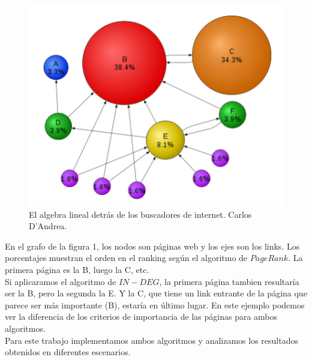 \begin{figure}
  \vspace{-20pt}
  \begin{center}
    \includegraphics[scale= 0.6]{imagenes/ejemplo-grafo-1.png}
  \end{center}
  \vspace{-20pt}
   \caption[Caption for LOF]{El algebra lineal detrás de los buscadores de internet. Carlos D'Andrea.\footnotemark}
  \vspace{-10pt}
  \label{fig:img1}
\end{figure}




En el grafo de la figura 1, los nodos son páginas web y los ejes son los links. Los porcentajes muestran el orden en el ranking según el algoritmo de $PageRank$. La primera página es la B, luego la C, etc.\\

 Si aplicaramos el algoritmo de $IN-DEG$, la primera página tambien resultaría ser la B, pero la segunda la E. Y la C, que tiene un link entrante de la página que parece ser más importante (B), estaría en último lugar. En este ejemplo podemos ver la diferencia de los criterios de importancia de las páginas para ambos algoritmos.\\

Para este trabajo implementamos ambos algoritmos y analizamos los resultados obtenidos en diferentes escenarios.\\

